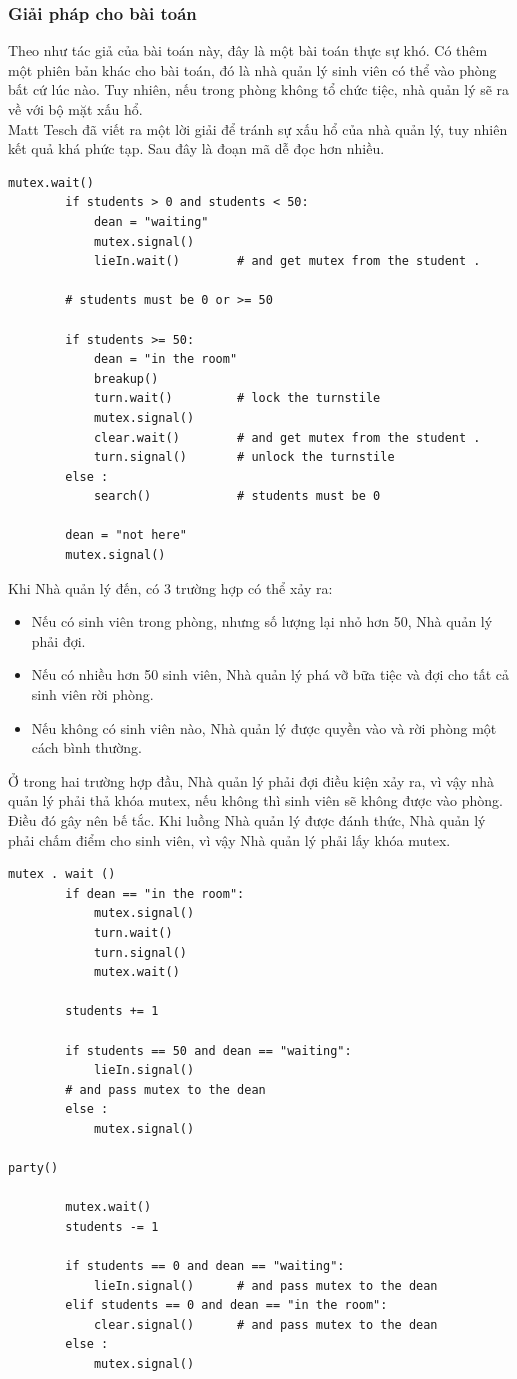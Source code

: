 \documentclass[12pt]{article}
\begin{document}
    	\subsubsection{Giải pháp cho bài toán}
    	Theo như tác giả của bài toán này, đây là một bài toán thực sự khó. Có thêm một phiên bản khác cho bài toán, đó là nhà quản lý sinh viên có thể vào phòng bất cứ lúc nào. Tuy nhiên, nếu trong phòng không tổ chức tiệc, nhà quản lý sẽ ra về với bộ mặt xấu hổ.\\
    	Matt Tesch đã viết ra một lời giải để tránh sự xấu hổ của nhà quản lý, tuy nhiên kết quả khá phức tạp. Sau đây là đoạn mã dễ đọc hơn nhiều.
\newpage
     	\begin{lstlisting}[style = Python]
    	mutex.wait()
		if students > 0 and students < 50:
			dean = "waiting"
			mutex.signal()
			lieIn.wait()		# and get mutex from the student .
		
		# students must be 0 or >= 50
		
		if students >= 50:
			dean = "in the room"
			breakup()
			turn.wait() 		# lock the turnstile
			mutex.signal()
			clear.wait()		# and get mutex from the student .
			turn.signal()		# unlock the turnstile
		else :
			search() 			# students must be 0

		dean = "not here"
		mutex.signal()
		\end{lstlisting}
		Khi Nhà quản lý đến, có 3 trường hợp có thể xảy ra:
		\begin{itemize}
		\item Nếu có sinh viên trong phòng, nhưng số lượng lại nhỏ hơn 50, Nhà quản lý phải đợi. 
		\item Nếu có nhiều hơn 50 sinh viên, Nhà quản lý phá vỡ bữa tiệc và đợi cho tất cả sinh viên rời phòng.
		\item Nếu không có sinh viên nào, Nhà quản lý được quyền vào và rời phòng một cách bình thường.
		\end{itemize}
    	Ở trong hai trường hợp đầu, Nhà quản lý phải đợi điều kiện xảy ra, vì vậy nhà quản lý phải thả khóa mutex, nếu không thì sinh viên sẽ không được vào phòng. Điều đó gây nên bế tắc. Khi luồng Nhà quản lý được đánh thức, Nhà quản lý phải chấm điểm cho sinh viên, vì vậy Nhà quản lý phải lấy khóa mutex.
     	\begin{lstlisting}[style = Python]
    			mutex . wait ()
		if dean == "in the room":
			mutex.signal()
			turn.wait()
			turn.signal()
			mutex.wait()

		students += 1

		if students == 50 and dean == "waiting":
			lieIn.signal()
		# and pass mutex to the dean
		else :
			mutex.signal()

party()

		mutex.wait()
		students -= 1

		if students == 0 and dean == "waiting":
			lieIn.signal()		# and pass mutex to the dean
		elif students == 0 and dean == "in the room":
			clear.signal()		# and pass mutex to the dean
		else :
			mutex.signal()
		\end{lstlisting}
\end{document}
